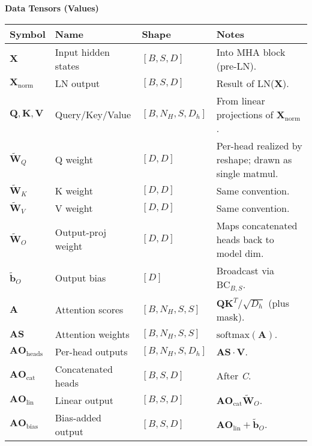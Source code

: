 \documentclass{article}
\begin{document}
\vspace{0.8em}

\begin{center}
\textbf{Data Tensors (Values)}
\begin{tabular}{llll}
\hline
\textbf{Symbol} & \textbf{Name} & \textbf{Shape} & \textbf{Notes} \\
\hline
$\mathbf{X}$                 & Input hidden states           & $[B,S,D]$       & Into MHA block (pre-LN). \\
$\mathbf{X}_{\text{norm}}$   & LN output                     & $[B,S,D]$       & Result of LN($\mathbf{X}$). \\
$\mathbf{Q},\mathbf{K},\mathbf{V}$ & Query/Key/Value         & $[B,N_H,S,D_h]$   & From linear projections of $\mathbf{X}_{\text{norm}}$. \\
$\widetilde{\mathbf{W}}_{Q}$ & Q weight                      & $[D,D]$         & Per-head realized by reshape; drawn as single matmul. \\
$\widetilde{\mathbf{W}}_{K}$ & K weight                      & $[D,D]$         & Same convention. \\
$\widetilde{\mathbf{W}}_{V}$ & V weight                      & $[D,D]$         & Same convention. \\
$\widetilde{\mathbf{W}}_{O}$ & Output-proj weight            & $[D,D]$         & Maps concatenated heads back to model dim. \\
$\widetilde{\mathbf{b}}_{O}$ & Output bias                   & $[D]$           & Broadcast via $\mathrm{BC}_{B,S}$. \\
$\mathbf{A}$                 & Attention scores              & $[B,N_H,S,S]$     & $\mathbf{Q}\mathbf{K}^T/\sqrt{D_h}$ (plus mask). \\
$\mathbf{AS}$                & Attention weights             & $[B,N_H,S,S]$     & $\mathrm{softmax}(\mathbf{A})$. \\
$\mathbf{AO}_{\text{heads}}$ & Per-head outputs              & $[B,N_H,S,D_h]$   & $\mathbf{AS}\cdot\mathbf{V}$. \\
$\mathbf{AO}_{\text{cat}}$   & Concatenated heads            & $[B,S,D]$       & After \textit{C}. \\
$\mathbf{AO}_{\text{lin}}$   & Linear output                 & $[B,S,D]$       & $\mathbf{AO}_{\text{cat}}\widetilde{\mathbf{W}}_{O}$. \\
$\mathbf{AO}_{\text{bias}}$  & Bias-added output             & $[B,S,D]$       & $\mathbf{AO}_{\text{lin}}+\widetilde{\mathbf{b}}_{O}$. \\

\end{tabular}
\end{center}
\end{document}
